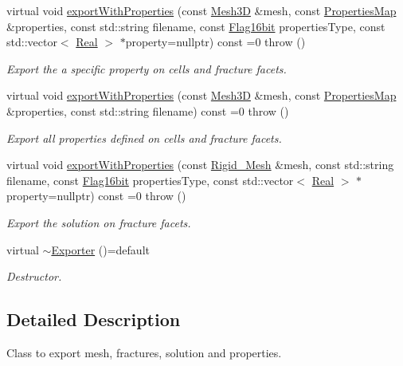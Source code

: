 \begin{DoxyCompactItemize}
virtual void \hyperlink{classFVCode3D_1_1Exporter_a8736cac571095709897065eb806f9d42}{export\+With\+Properties} (const \hyperlink{classFVCode3D_1_1Mesh3D}{Mesh3D} \&mesh, const \hyperlink{classFVCode3D_1_1PropertiesMap}{Properties\+Map} \&properties, const std\+::string filename, const \hyperlink{namespaceFVCode3D_a17a9cb86e2e25bbfbfcb645a2eec1d64}{Flag16bit} properties\+Type, const std\+::vector$<$ \hyperlink{namespaceFVCode3D_a40c1f5588a248569d80aa5f867080e83}{Real} $>$ $\ast$property=nullptr) const =0  throw ()
\begin{DoxyCompactList}\small\item\em Export the a specific property on cells and fracture facets. \end{DoxyCompactList}\item 
virtual void \hyperlink{classFVCode3D_1_1Exporter_a2435b0983607a3dc52ae3c0ad9e929a5}{export\+With\+Properties} (const \hyperlink{classFVCode3D_1_1Mesh3D}{Mesh3D} \&mesh, const \hyperlink{classFVCode3D_1_1PropertiesMap}{Properties\+Map} \&properties, const std\+::string filename) const =0  throw ()
\begin{DoxyCompactList}\small\item\em Export all properties defined on cells and fracture facets. \end{DoxyCompactList}\item 
virtual void \hyperlink{classFVCode3D_1_1Exporter_a47ac0dde9bd0234e03116179eff94353}{export\+With\+Properties} (const \hyperlink{classFVCode3D_1_1Rigid__Mesh}{Rigid\+\_\+\+Mesh} \&mesh, const std\+::string filename, const \hyperlink{namespaceFVCode3D_a17a9cb86e2e25bbfbfcb645a2eec1d64}{Flag16bit} properties\+Type, const std\+::vector$<$ \hyperlink{namespaceFVCode3D_a40c1f5588a248569d80aa5f867080e83}{Real} $>$ $\ast$property=nullptr) const =0  throw ()
\begin{DoxyCompactList}\small\item\em Export the solution on fracture facets. \end{DoxyCompactList}\item 
virtual \hyperlink{classFVCode3D_1_1Exporter_a807bdfe63fa4bff549c905fc91f8ac5e}{$\sim$\+Exporter} ()=default
\begin{DoxyCompactList}\small\item\em Destructor. \end{DoxyCompactList}\end{DoxyCompactItemize}


\subsection{Detailed Description}
Class to export mesh, fractures, solution and properties. 

